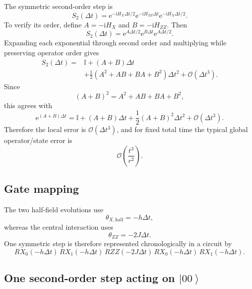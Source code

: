 \documentclass[11pt,a4paper]{article}
\newcommand{\ket}[1]{\left|#1\right\rangle}
\newcommand{\I}{\mathbb{I}}
\newcommand{\e}{\mathrm{e}}
\newcommand{\ii}{\mathrm{i}}
\newcommand{\Order}{\mathcal{O}}
\begin{document}
The symmetric second-order step is
\begin{equation}
\boxed{S_2(\Delta t)=
\e^{-\ii H_X\Delta t/2}
\e^{-\ii H_{ZZ}\Delta t}
\e^{-\ii H_X\Delta t/2}.}
\label{eq:S2}
\end{equation}
To verify its order, define $A=-\ii H_X$ and $B=-\ii H_{ZZ}$. Then
\begin{equation}
S_2(\Delta t)=\e^{A\Delta t/2}\e^{B\Delta t}\e^{A\Delta t/2}.
\end{equation}
Expanding each exponential through second order and multiplying while preserving operator order gives
\begin{align}
S_2(\Delta t)
={}&\I+(A+B)\Delta t\\
&+\frac{1}{2}\left(A^2+AB+BA+B^2\right)\Delta t^2
+\Order(\Delta t^3).
\end{align}
Since
\begin{equation}
(A+B)^2=A^2+AB+BA+B^2,
\end{equation}
this agrees with
\begin{equation}
\e^{(A+B)\Delta t}
=\I+(A+B)\Delta t+\frac{1}{2}(A+B)^2\Delta t^2+\Order(\Delta t^3).
\end{equation}
Therefore the local error is $\Order(\Delta t^3)$, and for fixed total time the typical global operator/state error is
\begin{equation}
\Order\left(\frac{t^3}{r^2}\right).
\end{equation}

\subsection{Gate mapping}

The two half-field evolutions use
\begin{equation}
\boxed{\theta_{X,\mathrm{half}}=-h\Delta t,}
\end{equation}
whereas the central interaction uses
\begin{equation}
\boxed{\theta_{ZZ}=-2J\Delta t.}
\end{equation}
One symmetric step is therefore represented chronologically in a circuit by
\begin{equation}
RX_0(-h\Delta t)\,RX_1(-h\Delta t)\,RZZ(-2J\Delta t)\,
RX_0(-h\Delta t)\,RX_1(-h\Delta t).
\end{equation}

\subsection{One second-order step acting on \texorpdfstring{$\ket{00}$}{|00>}}
\end{document}
